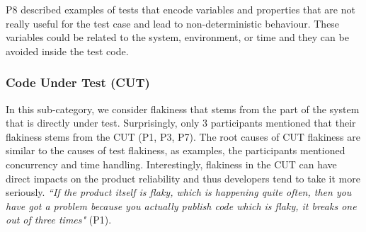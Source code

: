 P8 described examples of tests that encode variables and properties that are not really useful for the test case and lead to non-deterministic behaviour.
These variables could be related to the system, environment, or time and they can be avoided inside the test code.

\subsubsection{\textbf{Code Under Test (CUT)}}
In this sub-category, we consider flakiness that stems from the part of the system that is directly under test.
Surprisingly, only 3 participants mentioned that their flakiness stems from the CUT (P1, P3, P7).
The root causes of CUT flakiness are similar to the causes of test flakiness, as examples, the participants mentioned concurrency and time handling.
Interestingly, flakiness in the CUT can have direct impacts on the product reliability and thus developers tend to take it more seriously.
\textit{``If the product itself is flaky, which is happening quite often, then you have got a problem because you actually publish code which is flaky, it breaks one out of three times"} (P1).

